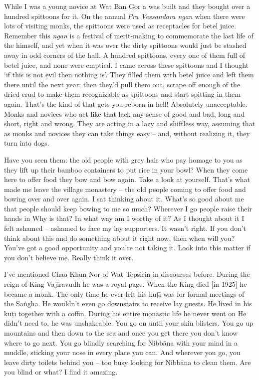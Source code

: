 While I was a young novice at Wat Ban Gor a  was built and they bought over a hundred spittoons for it. On the annual \textit{Pra Vessandara ngan} when there were lots of visiting monks, the spittoons were used as receptacles for betel juice. Remember this \textit{ngan} is a festival of merit-making to commemorate the last life of the  himself, and yet when it was over the dirty spittoons would just be stashed away in odd corners of the hall. A hundred spittoons, every one of them full of betel juice, and none were emptied. I came across these spittoons and I thought `if this is not evil then nothing is'. They filled them with betel juice and left them there until the next year; then they'd pull them out, scrape off enough of the dried crud to make them recognizable as spittoons and start spitting in them again. That's the kind of  that gets you reborn in hell! Absolutely unacceptable. Monks and novices who act like that lack any sense of good and bad, long and short, right and wrong. They are acting in a lazy and shiftless way, assuming that as monks and novices they can take things easy -- and, without realizing it, they turn into dogs.

Have you seen them: the old people with grey hair who pay homage to you as they lift up their bamboo containers to put rice in your bowl? When they come here to offer food they bow and bow again. Take a look at yourself. That's what made me leave the village monastery -- the old people coming to offer food and bowing over and over again. I sat thinking about it. What's so good about me that people should keep bowing to me so much? Wherever I go people raise their hands in  Why is that? In what way am I worthy of it? As I thought about it I felt ashamed -- ashamed to face my lay supporters. It wasn't right. If you don't think about this and do something about it right now, then when will you? You've got a good opportunity and you're not taking it. Look into this matter if you don't believe me. Really think it over.

I've mentioned Chao Khun Nor of Wat Tepsirin in discourses before. During the reign of King Vajiravudh he was a royal page. When the King died [in 1925] he became a monk. The only time he ever left his ku\d{t}\={\i} was for formal meetings of the Sa\.ngha. He wouldn't even go downstairs to receive lay guests. He lived in his ku\d{t}\={\i} together with a coffin. During his entire monastic life he never went on  He didn't need to, he was unshakeable. You go on  until your skin blisters. You go up mountains and then down to the sea and once you get there you don't know where to go next. You go blindly searching for Nibb\=ana with your mind in a muddle, sticking your nose in every place you can. And wherever you go, you leave dirty toilets behind you -- too busy looking for Nibb\=ana to clean them. Are you blind or what? I find it amazing.

